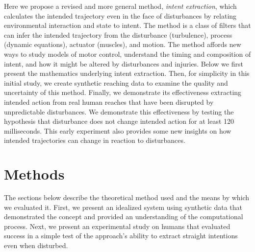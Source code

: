 Here we propose a revised and more general method, \textit{intent extraction}, which calculates the intended trajectory even in the face of disturbances by relating environmental interaction and state to intent. The method is a class of filters that can infer the intended trajectory from the disturbance (turbulence), process (dynamic equations), actuator (muscles), and motion. The method affords new ways to study models of motor control, understand the timing and composition of intent, and how it might be altered by disturbances and injuries. Below we first present the mathematics underlying intent extraction. Then, for simplicity in this initial study, we create synthetic reaching data to examine the quality and uncertainty of this method. Finally, we demonstrate its effectiveness extracting intended action from real human reaches that have been disrupted by unpredictable disturbances. We demonstrate this effectiveness by testing the hypothesis that disturbance does not change intended action for at least 120 milliseconds. This early experiment also provides some new insights on how intended trajectories can change in reaction to disturbances. 

\section*{Methods}
The sections below describe the theoretical method used and the means by which we evaluated it. First, we present an idealized system using synthetic data that demonstrated the concept and provided an understanding of the computational process. Next, we present an experimental study on humans that evaluated success in a simple test of the approach's ability to extract straight intentions even when disturbed. 

